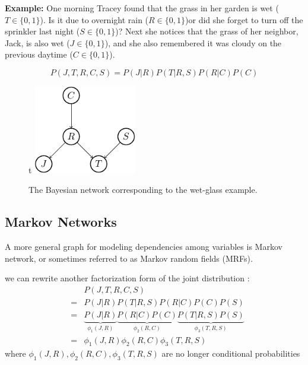 \begin{shaded}
   \textbf{Example:} One morning Tracey found that the grass in her garden is wet ($T\in\{0,1\}$). Is it due to overnight rain ($R \in\{0,1\}$)or did
she forget to turn off the sprinkler last night ($S\in\{0,1\}$)? Next she notices that the grass of her neighbor, Jack, is also
wet ($J\in\{0,1\}$), and she also remembered it was cloudy on the previous daytime ($C\in\{0,1\}$).                   
\end{shaded}

\begin{equation}
 P(J,T,R,C,S)=P(J|R)P(T|R,S)P(R|C)P(C)
\end{equation}

\begin{figure}{t}
   \centering
   \includegraphics[width=0.4\textwidth]{./Figures/wet_glass_BN.pdf}
   \caption{The Bayesian network corresponding to the wet-glass example.}
\end{figure}

\subsection{Markov Networks}
A more general graph for modeling dependencies among variables is Markov network, or sometimes referred to as Markov random fields (MRFs).      

we can rewrite another factorization form of the joint distribution : 
\begin{equation*}
 \begin{array}{rcl}
   & & P(J,T,R,C,S)\\
   &=& P(J|R)P(T|R,S)P(R|C)P(C)P(S) \\
   &=& \underbrace{P(J|R)}_{\phi_1(J,R)} \underbrace{P(R|C)P(C)}_{\phi_2(R,C)} \underbrace{P(T|R,S)P(S)}_{\phi_3(T,R,S)}\\
   &=& \phi_1(J,R)\phi_2(R,C)\phi_3(T,R,S)
 \end{array}
\end{equation*}
where $\phi_1(J,R), \phi_2(R,C),\phi_3(T,R,S)$ are no longer conditional probabilities

